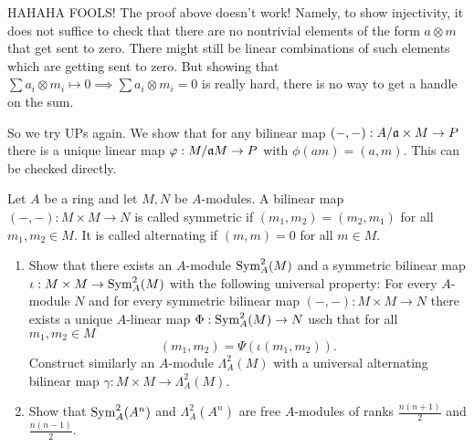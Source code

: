 \documentclass[a4paper,11pt]{article}
\begin{document}
\begin{enumerate}
            HAHAHA FOOLS! The proof above doesn't work! Namely, to show injectivity,
            it does not suffice to check that there are no nontrivial
            elements of the form $a \otimes m$ that get sent to zero. There might
            still be linear combinations of such elements which are getting
            sent to zero. But showing that $\sum a_i \otimes m_i \mapsto 0
            \implies \sum a_i \otimes m_i = 0$ is really hard, there is no way
            to get a handle on the sum. 
            
            So we try UPs again. We show that for any bilinear map
            $(-,-): A/\mathfrak{a} \times M \to P$ there is a unique linear map 
            $\varphi: M/\mathfrak{a} M \to P$ with $\phi(am) = (a,m)$. This can be checked
            directly. 
\end{enumerate}

Let $A$ be a ring and let $M,N$ be $A$-modules. A bilinear map 
$(-,-): M \times M \to N$ is called symmetric if $(m_1, m_2) = (m_2, m_1)$ for all
$m_1, m_2 \in M$. It is called alternating if $(m,m) = 0$ for all $m \in M$. 
\begin{enumerate}
    \item Show that there exists an $A$-module $\operatorname{Sym}^2_A(M)$ and a symmetric bilinear
        map $\iota: M \times M \to \operatorname{Sym}^2_A(M)$ with the following universal
        property: For every $A$-module $N$ and for every symmetric bilinear map
        $(-,-): M \times M \to N$ there exists a unique $A$-linear map $\Phi:
        \operatorname{Sym}^2_A(M) \to N$ usch that for all $m_1, m_2 \in M$
        \begin{equation*}
            (m_1, m_2) = \Psi(\iota(m_1, m_2)).
        \end{equation*}
        Construct similarly an $A$-module $\Lambda^2_A(M)$ with a universal
        alternating bilinear map $\gamma: M \times M \to \Lambda^2_A(M)$. 

    \item Show that $\operatorname{Sym}^2_A(A^n)$ and $\Lambda^2_A(A^n)$ are free $A$-modules
        of ranks $\frac{n(n+1)}2$ and $\frac{n(n-1)}2$. 
\end{enumerate}
\end{document}
